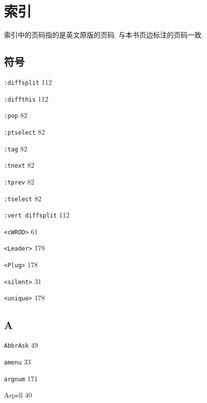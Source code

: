 \chapter{索引}
\label{chap:index}

索引中的页码指的是英文原版的页码, 与本书页边标注的页码一致.

\begin{multicols}{2}

\setlength\parindent{0pt}

\hangindent=2pc  \section*{符号}

\hangindent=2pc  \texttt{:diffsplit} 112

\hangindent=2pc  \texttt{:diffthis} 112

\hangindent=2pc  \texttt{:pop} 82

\hangindent=2pc  \texttt{:ptselect} 82

\hangindent=2pc  \texttt{:tag} 82

\hangindent=2pc  \texttt{:tnext} 82

\hangindent=2pc  \texttt{:tprev} 82

\hangindent=2pc  \texttt{:tselect} 82

\hangindent=2pc  \texttt{:vert diffsplit} 112

\hangindent=2pc  \texttt{<cWROD>} 61

\hangindent=2pc  \texttt{<Leader>} 178

\hangindent=2pc  \texttt{<Plug>} 178

\hangindent=2pc  \texttt{<silent>} 31

\hangindent=2pc  \texttt{<unique>} 178

\hangindent=2pc  \section*{A}

\hangindent=2pc  \texttt{AbbrAsk} 49

\hangindent=2pc  \texttt{amenu} 33

\hangindent=2pc  \texttt{argnum} 171

\hangindent=2pc  Aspell 40


\end{multicols}
